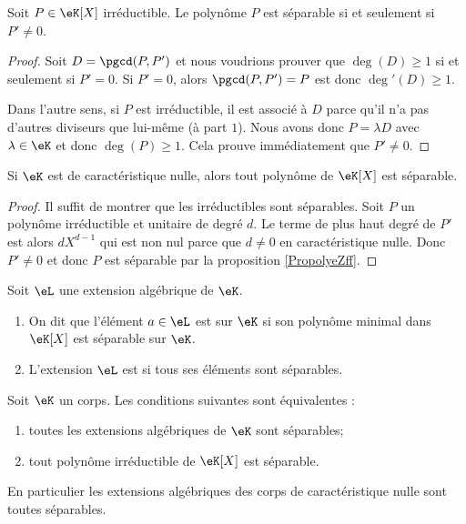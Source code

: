 \begin{proposition}
    Soit \( P\in \eK[X]\) irréductible. Le polynôme \( P\) est séparable si et seulement si \( P'\neq 0\).
\end{proposition}

\begin{proof}
    Soit \( D=\pgcd(P,P')\) et nous voudrions prouver que \( \deg(D)\geq 1\) si et seulement si \( P'=0\). Si \( P'=0\), alors \( \pgcd(P,P')=P\) est donc \( \deg'(D)\geq 1\).

    Dans l'autre sens, si \( P\) est irréductible, il est associé à \( D\) parce qu'il n'a pas d'autres diviseurs que lui-même (à part \( 1\)). Nous avons donc \( P=\lambda D\) avec \( \lambda\in \eK\) et donc \( \deg(P)\geq 1\). Cela prouve immédiatement que \( P'\neq 0\).
\end{proof}

\begin{corollary}   \label{CorUjfJSE}
    Si \( \eK\) est de caractéristique nulle, alors tout polynôme de \( \eK[X]\) est séparable.
\end{corollary}

\begin{proof}
    Il suffit de montrer que les irréductibles sont séparables. Soit \( P\) un polynôme irréductible et unitaire de degré \( d\). Le terme de plus haut degré de \( P'\) est alors \( dX^{d-1}\) qui est non nul parce que \( d\neq 0\) en caractéristique nulle. Donc \( P'\neq 0\) et donc \( P\) est séparable par la proposition \ref{PropolyeZff}.
\end{proof}

\begin{definition}
    Soit \( \eL\) une extension algébrique de \( \eK\).
    \begin{enumerate}
        \item
            On dit que l'élément \( a\in \eL\) est  sur \( \eK\) si son polynôme minimal dans \( \eK[X]\) est séparable sur \( \eK\).
        \item
            L'extension \( \eL\) est  si tous ses éléments sont séparables.
    \end{enumerate}
\end{definition}

\begin{proposition} \label{PropUmxJVw}
    Soit \( \eK\) un corps. Les conditions suivantes sont équivalentes :
    \begin{enumerate}
        \item
            toutes les extensions algébriques de \( \eK\) sont séparables;
        \item
            tout polynôme irréductible de \( \eK[X]\) est séparable.
    \end{enumerate}
    En particulier les extensions algébriques des corps de caractéristique nulle sont toutes séparables.
\end{proposition}

